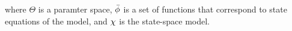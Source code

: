 \documentclass[../Article_Model_Parameters.tex]{subfiles}
\begin{document}
		where $\Theta$ is a paramter space, ${\color{black}\bar{\phi}}$ is a set of functions that correspond to state equations of the model, and ${\color{black}\chi}$ is the state-space model.
		
		\fi
		
			
						
%			
%			
			
\end{document}
